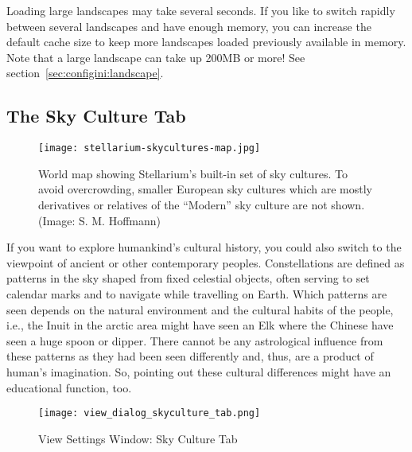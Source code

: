 Loading large landscapes may take several seconds.
If you like to switch rapidly between several landscapes and have enough memory, 
you can increase the default cache size to keep more landscapes loaded previously 
available in memory. Note that a large landscape can take up 200MB or more! 
See section~\ref{sec:configini:landscape}.

\subsection{The Sky Culture Tab}
\label{sec:gui:view:skyculture}


\begin{figure}[th]\centering
\texttt{[image: stellarium-skycultures-map.jpg]}
\caption{World map showing Stellarium's built-in set of
  sky cultures. To avoid overcrowding, smaller European sky cultures
  which are mostly derivatives or relatives of the ``Modern'' sky culture are not
  shown. (Image: S. M. Hoffmann)}
\label{fig:skycultures}
\end{figure}

\noindent If you want to explore humankind's cultural history, you could also
switch to the viewpoint of ancient or other contemporary peoples. 
Constellations are defined as patterns in the sky shaped from fixed celestial objects, 
often serving to set calendar marks and to navigate while travelling on Earth. 
Which patterns are seen depends on the natural environment and the cultural
habits of the people, i.e., the Inuit in the arctic area might have
seen an Elk where the Chinese have seen a huge spoon or dipper. There
cannot be any astrological influence from these patterns as they had
been seen differently and, thus, are a product of human's
imagination. So, pointing out these cultural differences might have an
educational function, too.

\noindent%
\colorbox{light-gray}{}


\begin{figure}[htbp]
\centering\texttt{[image: view\_dialog\_skyculture\_tab.png]}
\caption{View Settings Window: Sky Culture Tab}
\label{fig:gui:view:skyculture}
\end{figure}

